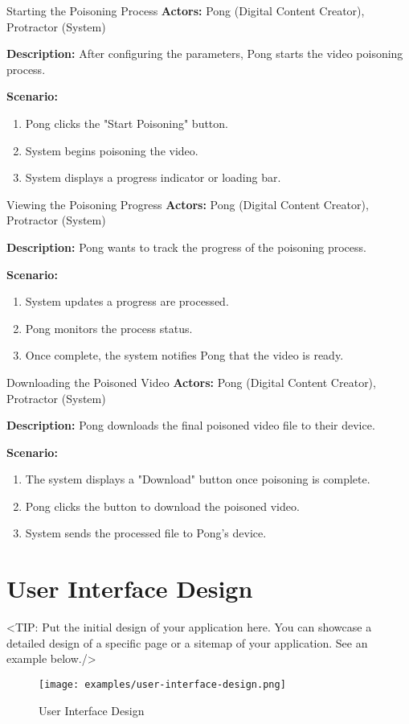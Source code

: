 \begin{usecase}{Starting the Poisoning Process}
    \textbf{Actors:} Pong (Digital Content Creator), Protractor (System)

    \textbf{Description:} After configuring the parameters, Pong starts the video poisoning process.

    \textbf{Scenario:}
    \begin{enumerate}[leftmargin=80pt]
        \item Pong clicks the "Start Poisoning" button.
        \item System begins poisoning the video.
        \item System displays a progress indicator or loading bar.
    \end{enumerate}
\end{usecase}

\begin{usecase}{Viewing the Poisoning Progress}
    \textbf{Actors:} Pong (Digital Content Creator), Protractor (System)

    \textbf{Description:} Pong wants to track the progress of the poisoning process.

    \textbf{Scenario:}
    \begin{enumerate}[leftmargin=80pt]
        \item System updates a progress are processed.
        \item Pong monitors the process status.
        \item Once complete, the system notifies Pong that the video is ready.
    \end{enumerate}
\end{usecase}

\begin{usecase}{Downloading the Poisoned Video}
    \textbf{Actors:} Pong (Digital Content Creator), Protractor (System)

    \textbf{Description:} Pong downloads the final poisoned video file to their device.

    \textbf{Scenario:}
    \begin{enumerate}[leftmargin=80pt]
        \item The system displays a "Download" button once poisoning is complete.
        \item Pong clicks the button to download the poisoned video.
        \item System sends the processed file to Pong’s device.
    \end{enumerate}
\end{usecase}


\section{User Interface Design}
\label{section:user-interface-design}
<TIP: Put the initial design of your application here. You can
showcase a detailed design of a specific page or a sitemap of your application.
See an example below./>

\begin{figure}[h]
    \centering
    \texttt{[image: examples/user-interface-design.png]}
    \caption{User Interface Design}
\end{figure}